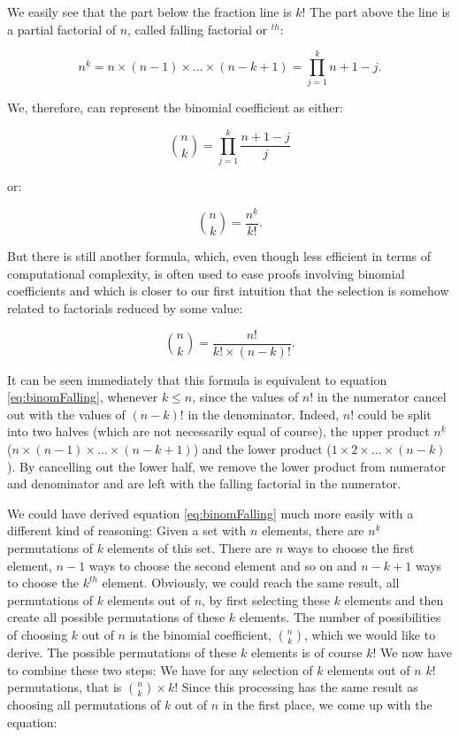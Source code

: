 \documentclass{scrreprt}
\begin{document}
We easily see
that the part below the fraction line  
is $k!$ 
The part above the line
is a partial factorial of $n$,
called falling factorial or  $^{th}$:

\begin{equation}
  n^{\underline{k}} = n \times (n-1) \times \dots \times (n-k+1) = 
  \prod_{j=1}^{k}{n + 1 - j}.
\end{equation}

We, therefore, can represent the
binomial coefficient as either:

\begin{equation}\label{eq:binomProduct}
\binom{n}{k} = 
\prod_{j=1}^{k}{\frac{n + 1 - j}{j}}
\end{equation}

or:

\begin{equation}\label{eq:binomFalling}
\binom{n}{k} = \frac{n^{\underline{k}}}{k!}.
\end{equation}

But there is still another formula,
which, even though less efficient
in terms of computational complexity,
is often used to ease proofs
involving binomial coefficients and
which is closer to our first
intuition that the selection is
somehow related to factorials
reduced by some value:

\begin{equation}
\binom{n}{k} = \frac{n!}{k! \times (n-k)!}.
\end{equation}

It can be seen immediately that this formula
is equivalent to equation \ref{eq:binomFalling},
whenever $k \le n$, since the values of $n!$
in the numerator cancel out with the values of
$(n-k)!$ in the denominator.
Indeed, $n!$ could be split into two
halves (which are not necessarily equal of course), 
the upper product $n^{\underline{k}}$
($n \times (n-1) \times \dots \times (n-k+1)$)
and the lower product 
($1 \times 2 \times\dots \times (n-k)$).
By cancelling out the lower half,
we remove the lower product
from numerator and denominator
and are left with the falling factorial
in the numerator.

We could have derived equation \ref{eq:binomFalling}
much more easily with a different kind of reasoning:
Given a set with $n$ elements,
there are $n^{\underline{k}}$ permutations
of $k$ elements of this set.
There are $n$ ways to choose the first element,
$n-1$ ways to choose the second element and so on
and $n-k+1$ ways to choose the $k^{th}$ element.
Obviously, we could reach the same result,
all permutations of $k$ elements out of $n$,
by first selecting these $k$ elements
and then create all possible permutations
of these $k$ elements. 
The number of possibilities of
choosing $k$ out of $n$ is the binomial coefficient, $\binom{n}{k}$,
which we would like to derive. 
The possible permutations of these $k$ elements
is of course $k!$
We now have to combine these two steps:
We have for any selection of $k$ elements out of $n$
$k!$ permutations, that is $\binom{n}{k} \times k!$
Since this processing has the same result
as choosing all permutations of $k$ out of $n$
in the first place, we come up with the equation:
\end{document}
